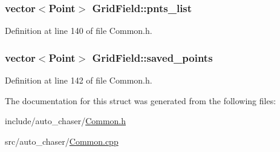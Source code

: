 \subsubsection[{\texorpdfstring{pnts\+\_\+list}{pnts_list}}]{\setlength{\rightskip}{0pt plus 5cm}vector$<$Point$>$ Grid\+Field\+::pnts\+\_\+list}\hypertarget{struct_grid_field_a76901c3a463e8cbe456c8f73bc264380}{}\label{struct_grid_field_a76901c3a463e8cbe456c8f73bc264380}


Definition at line 140 of file Common.\+h.

\subsubsection[{\texorpdfstring{saved\+\_\+points}{saved_points}}]{\setlength{\rightskip}{0pt plus 5cm}vector$<$Point$>$ Grid\+Field\+::saved\+\_\+points}\hypertarget{struct_grid_field_ad5dc16fb46eef17df3a554f5b5604611}{}\label{struct_grid_field_ad5dc16fb46eef17df3a554f5b5604611}


Definition at line 142 of file Common.\+h.



The documentation for this struct was generated from the following files\+:\begin{DoxyCompactItemize}
\item 
include/auto\+\_\+chaser/\hyperlink{_common_8h}{Common.\+h}\item 
src/auto\+\_\+chaser/\hyperlink{_common_8cpp}{Common.\+cpp}\end{DoxyCompactItemize}
